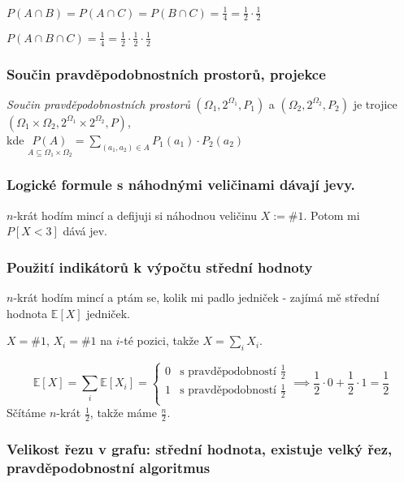 \documentclass[10pt,a4paper]{article}
\newcommand{\E}{{\mathbb{E}}}
\begin{document}
$P(A\cap B)= P(A\cap C)= P(B\cap C)=\frac 14 = \frac 12 \cdot \frac 12$

$P(A\cap B \cap C)=\frac 14 = \frac 12 \cdot \frac 12 \cdot \frac 12$

\subsubsection{Součin pravděpodobnostních prostorů, projekce}

\textit{Součin pravděpodobnostních prostorů} $(\Omega_1, 2^{\Omega_1}, P_1)$ a $(\Omega_2, 2^{\Omega_2}, P_2)$ je trojice $(\Omega_1 \times \Omega_2, 2^{\Omega_1}\times 2^{\Omega_2}, P)$, \\
kde  $\displaystyle \underset{A \subseteq \Omega_1 \times \Omega_2}{P(A)} = \sum_{(a_1,a_2) \in A} P_1(a_1) \cdot P_2(a_2)$

\subsubsection{Logické formule s náhodnými veličinami dávají jevy.}

$n$-krát hodím mincí a defijuji si náhodnou veličinu $X := \#1$. Potom mi $P[X<3]$ dává jev.

\subsubsection{Použití indikátorů k výpočtu střední hodnoty}

$n$-krát hodím mincí a ptám se, kolik mi padlo jedniček - zajímá mě střední hodnota $\E [X]$ jedniček.

$X = \# 1$, $X_i = \# 1$ na $i$-té pozici, takže $\displaystyle X = \sum_{i} X_i$.

\[
    \displaystyle \E [X] = \sum_{i} \E [X_i] = \begin{cases}
        0 &\text{s pravděpodobností }\frac 12\\
        1 &\text{s pravděpodobností }\frac 12\\
    \end{cases} \implies \frac 12 \cdot 0 + \frac 12 \cdot 1 = \frac 12
\]
Sčítáme $n$-krát $\frac 12$, takže máme $\frac n2$.

\subsubsection{Velikost řezu v grafu: střední hodnota, existuje velký řez, pravděpodobnostní algoritmus}
\end{document}
